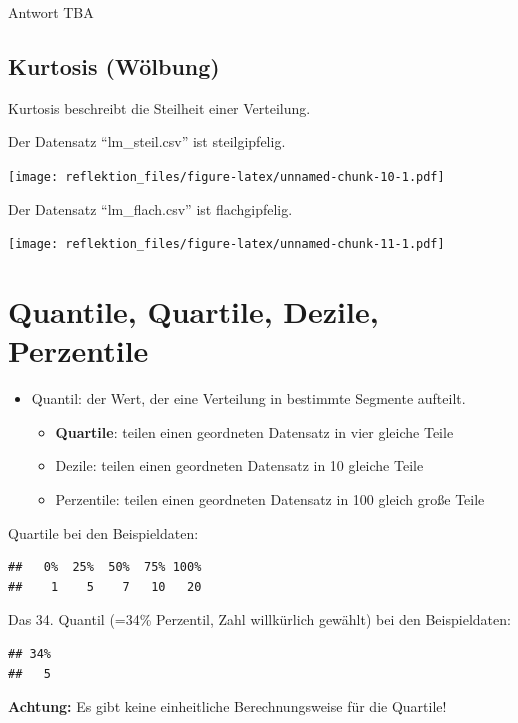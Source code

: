 \documentclass[
]{book}
\providecommand{\tightlist}{%
  \setlength{\itemsep}{0pt}\setlength{\parskip}{0pt}}
\begin{document}
Antwort TBA

\hypertarget{kurtosis-wuxf6lbung}{%
\subsection{Kurtosis (Wölbung)}\label{kurtosis-wuxf6lbung}}

Kurtosis beschreibt die Steilheit einer Verteilung.

Der Datensatz ``lm\_steil.csv'' ist steilgipfelig.

\texttt{[image: reflektion\_files/figure-latex/unnamed-chunk-10-1.pdf]}

Der Datensatz ``lm\_flach.csv'' ist flachgipfelig.

\texttt{[image: reflektion\_files/figure-latex/unnamed-chunk-11-1.pdf]}

\hypertarget{quantile-quartile-dezile-perzentile}{%
\section{Quantile, Quartile, Dezile, Perzentile}\label{quantile-quartile-dezile-perzentile}}

\begin{itemize}
\tightlist
\item
  Quantil: der Wert, der eine Verteilung in bestimmte Segmente aufteilt.

  \begin{itemize}
  \tightlist
  \item
    \textbf{Quartile}: teilen einen geordneten Datensatz in vier gleiche Teile
  \item
    Dezile: teilen einen geordneten Datensatz in 10 gleiche Teile
  \item
    Perzentile: teilen einen geordneten Datensatz in 100 gleich große Teile
  \end{itemize}
\end{itemize}

Quartile bei den Beispieldaten:

\begin{verbatim}
##   0%  25%  50%  75% 100% 
##    1    5    7   10   20
\end{verbatim}

Das 34. Quantil (=34\% Perzentil, Zahl willkürlich gewählt) bei den Beispieldaten:

\begin{verbatim}
## 34% 
##   5
\end{verbatim}

\textbf{Achtung:} Es gibt keine einheitliche Berechnungsweise für die Quartile!
\end{document}
